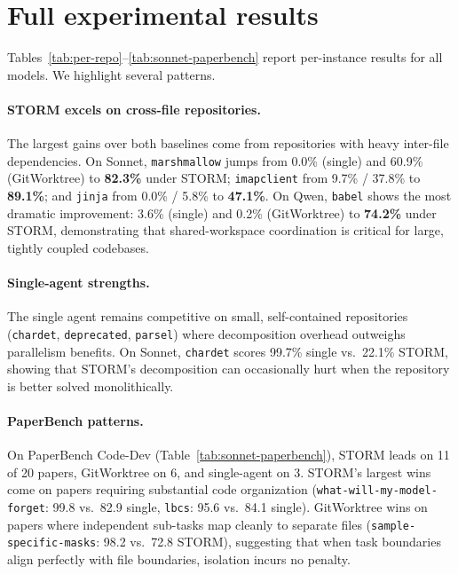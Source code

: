 \documentclass{article}
\begin{document}
\section{Full experimental results}
\label{app:full-results}


Tables~\ref{tab:per-repo}--\ref{tab:sonnet-paperbench} report per-instance results for all models. We highlight several patterns.

\paragraph{STORM excels on cross-file repositories.} The largest gains over both baselines come from repositories with heavy inter-file dependencies. On Sonnet, \texttt{marshmallow} jumps from 0.0\% (single) and 60.9\% (GitWorktree) to \textbf{82.3\%} under STORM; \texttt{imapclient} from 9.7\% / 37.8\% to \textbf{89.1\%}; and \texttt{jinja} from 0.0\% / 5.8\% to \textbf{47.1\%}. On Qwen, \texttt{babel} shows the most dramatic improvement: 3.6\% (single) and 0.2\% (GitWorktree) to \textbf{74.2\%} under STORM, demonstrating that shared-workspace coordination is critical for large, tightly coupled codebases.

\paragraph{Single-agent strengths.} The single agent remains competitive on small, self-contained repositories (\texttt{chardet}, \texttt{deprecated}, \texttt{parsel}) where decomposition overhead outweighs parallelism benefits. On Sonnet, \texttt{chardet} scores 99.7\% single vs.\ 22.1\% STORM, showing that STORM's decomposition can occasionally hurt when the repository is better solved monolithically.

\paragraph{PaperBench patterns.} On PaperBench Code-Dev (Table~\ref{tab:sonnet-paperbench}), STORM leads on 11 of 20 papers, GitWorktree on 6, and single-agent on 3. STORM's largest wins come on papers requiring substantial code organization (\texttt{what-will-my-model-forget}: 99.8 vs.\ 82.9 single, \texttt{lbcs}: 95.6 vs.\ 84.1 single). GitWorktree wins on papers where independent sub-tasks map cleanly to separate files (\texttt{sample-specific-masks}: 98.2 vs.\ 72.8 STORM), suggesting that when task boundaries align perfectly with file boundaries, isolation incurs no penalty.
\end{document}
